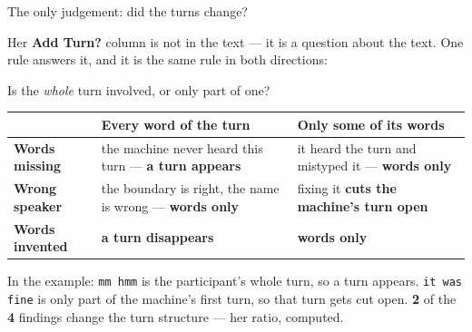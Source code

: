 \documentclass[aspectratio=169]{beamer}
\newcommand{\keybox}[1]{%
  \par\vspace{4pt}\begingroup\centering
  \colorbox{warmbg}{\parbox{0.93\textwidth}{\centering #1}}%
  \par\endgroup\vspace{2pt}}
\newcommand{\bigidea}[1]{%
  \vfill
  \begingroup\centering
  \colorbox{warmbg}{\parbox{0.93\textwidth}{\centering \large #1}}%
  \par\endgroup
  \vfill}
\newenvironment{nicetable}[1]
  {\par\vspace{2pt}\begingroup\centering\small
   \renewcommand{\arraystretch}{1.18}%
   \setlength{\tabcolsep}{6pt}\rowcolors{2}{band}{white}%
   \begin{tabular}{#1}\arrayrulecolor{hdr}\toprule}
  {\bottomrule\end{tabular}\par\endgroup\vspace{2pt}}
\newcommand{\hd}[1]{\textcolor{hdr}{\textbf{#1}}}
\newcommand{\num}[1]{\textcolor{warm}{\textbf{#1}}}
\begin{document}
\begin{frame}{The only judgement: did the turns change?}

Her \textbf{Add Turn?} column is not in the text --- it is a question about the text. One
rule answers it, and it is the same rule in both directions:

\bigidea{Is the \emph{whole} turn involved, or only part of one?}

\begin{nicetable}{p{3.2cm}p{4.6cm}p{4.4cm}}
\hd{} & \hd{Every word of the turn} & \hd{Only some of its words} \\ \midrule
\hd{Words missing} & the machine never heard this turn ---
  \textcolor{warm}{\textbf{a turn appears}}
  & it heard the turn and mistyped it --- \textbf{words only} \\
\hd{Wrong speaker} & the boundary is right, the name is wrong --- \textbf{words only}
  & fixing it \textcolor{warm}{\textbf{cuts the machine's turn open}} \\
\hd{Words invented} & \textcolor{warm}{\textbf{a turn disappears}} & \textbf{words only} \\
\end{nicetable}

\keybox{In the example: \texttt{mm hmm} is the participant's whole turn, so a turn appears.
\texttt{it was fine} is only part of the machine's first turn, so that turn gets cut open.
\num{2} of the \num{4} findings change the turn structure --- her ratio, computed.}

\end{frame}
\end{document}
